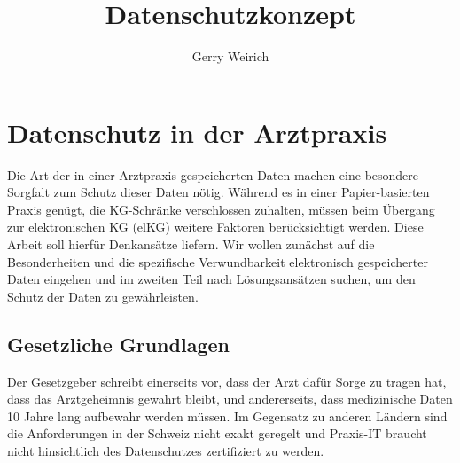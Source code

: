 \documentclass[a4paper]{scrartcl}
\begin{document}
\title{Datenschutzkonzept}
\author{Gerry Weirich}
\maketitle
\section{Datenschutz in der Arztpraxis}
Die Art der in einer Arztpraxis gespeicherten Daten machen eine besondere Sorgfalt zum Schutz dieser Daten nötig. Während es in einer Papier-basierten Praxis genügt, die KG-Schränke verschlossen zuhalten, müssen beim Übergang zur elektronischen KG (elKG) weitere Faktoren berücksichtigt werden. Diese Arbeit soll hierfür Denkansätze liefern. Wir wollen zunächst auf die Besonderheiten und die spezifische Verwundbarkeit elektronisch gespeicherter Daten eingehen und im zweiten Teil nach Lösungsansätzen suchen, um den Schutz der Daten zu gewährleisten.

\subsection{Gesetzliche Grundlagen}
Der Gesetzgeber schreibt einerseits vor, dass der Arzt dafür Sorge zu tragen hat, dass das Arztgeheimnis gewahrt bleibt, und andererseits, dass medizinische Daten 10 Jahre lang aufbewahr werden müssen. Im Gegensatz zu anderen Ländern sind die Anforderungen in der Schweiz nicht exakt geregelt und Praxis-IT braucht nicht hinsichtlich des Datenschutzes zertifiziert zu werden.
\end{document}
